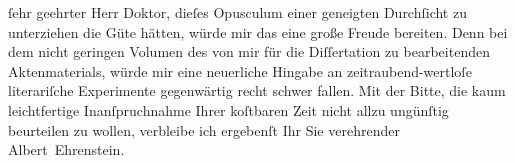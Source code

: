 \begin{ledgroupsized}[t]{13cm}
                  {\pb}ſehr geehrter Herr Doktor, dieſes Opusculum einer geneigten
               Durchſicht zu unterziehen die Güte hätten, würde mir das eine große Freude bereiten.
               Denn bei dem nicht geringen Volumen des von mir für die Diſſertation zu bearbeitenden
               Aktenmaterials, würde mir eine neuerliche Hingabe an zeitraubend-wertloſe
               literariſche Experimente gegenwärtig recht schwer fallen.\pend
           \pstart
           Mit der Bitte, die kaum leichtfertige Inanſpruchnahme Ihrer koſtbaren Zeit nicht
               allzu ungünſtig beurteilen zu wollen, verbleibe ich ergebenſt Ihr Sie verehrender\pend
           \pstart \spacefill\mbox{Albert Ehrenstein.}\pend{}
         
         \endnumbering{}\end{ledgroupsized}  \newcommand{\dateiname}{L01822}\newcommand{\titel}{Albert Ehrenstein an Arthur Schnitzler, 15. 1. 1909}\newcommand{\editorInnen}{Martin Anton Müller und Gerd-Hermann Susen}
      